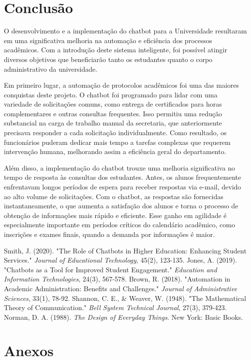 \documentclass[12pt,a4paper]{article} %
\begin{document}
\section{Conclusão}

\noindent O desenvolvimento e a implementação do chatbot para a Universidade resultaram em uma significativa melhoria na automação e eficiência dos processos acadêmicos. Com a introdução deste sistema inteligente, foi possível atingir diversos objetivos que beneficiarão tanto os estudantes quanto o corpo administrativo da universidade.

\noindent Em primeiro lugar, a automação de protocolos acadêmicos foi uma das maiores conquistas deste projeto. O chatbot foi programado para lidar com uma variedade de solicitações comuns, como entrega de certificados para horas complementares e outras consultas frequentes. Isso permitiu uma redução substancial na carga de trabalho manual da secretaria, que anteriormente precisava responder a cada solicitação individualmente. Como resultado, os funcionários puderam dedicar mais tempo a tarefas complexas que requerem intervenção humana, melhorando assim a eficiência geral do departamento.

\noindent Além disso, a implementação do chatbot trouxe uma melhoria significativa no tempo de resposta às consultas dos estudantes. Antes, os alunos frequentemente enfrentavam longos períodos de espera para receber respostas via e-mail, devido ao alto volume de solicitações. Com o chatbot, as respostas são fornecidas instantaneamente, o que aumenta a satisfação dos alunos e torna o processo de obtenção de informações mais rápido e eficiente. Esse ganho em agilidade é especialmente importante em períodos críticos do calendário acadêmico, como inscrições e exames finais, quando a demanda por informações é maior.

\newpage

\begin{thebibliography}{99}
 Smith, J. (2020). "The Role of Chatbots in Higher Education: Enhancing Student Services." \textit{Journal of Educational Technology}, 45(2), 123-135.
 Jones, A. (2019). "Chatbots as a Tool for Improved Student Engagement." \textit{Education and Information Technologies}, 24(3), 567-578.
 Brown, R. (2018). "Automation in Academic Administration: Benefits and Challenges." \textit{Journal of Administrative Sciences}, 33(1), 78-92.
 Shannon, C. E., \& Weaver, W. (1948). "The Mathematical Theory of Communication." \textit{Bell System Technical Journal}, 27(3), 379-423.
 Norman, D. A. (1988). \textit{The Design of Everyday Things}. New York: Basic Books.
\end{thebibliography}

\newpage

\appendix
\section{Anexos}

\end{document}

